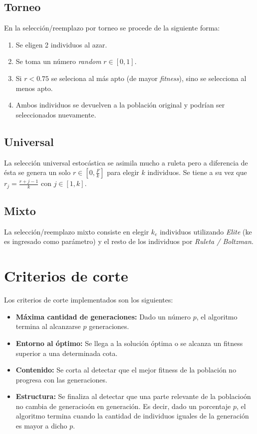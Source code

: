 \documentclass[%
    final,
    reprint,
    notitlepage,
    narroweqnarray,
    inline,
    twoside,
    invited
    ]{ieee}
\begin{document}
\subsection{Torneo}

En la selección/reemplazo por torneo se procede de la siguiente forma:

\begin{enumerate}
\item Se eligen 2 individuos al azar. 
\item Se toma un número \textit{random} $r \in [0, 1]$.
\item Si $r < 0.75$ se seleciona al más apto (de mayor \textit{fitness}), sino se selecciona al menos apto.
\item Ambos individuos se devuelven a la población original y podrían ser seleccionados nuevamente.
\end{enumerate}

\subsection{Universal}

\par La selección universal estocástica se asimila mucho a ruleta pero a diferencia de ésta se genera un solo $r \in [0, \frac{F}{k}]$ para elegir $k$ individuos.  Se tiene a su vez que $r_j = \frac{r + j-1}{k}$ con $j \in [1,k]$.

\subsection{Mixto}

La selección/reemplazo mixto consiste en elegir $k_e$ individuos utilizando \textit{Elite} (ke es ingresado como parámetro) y el resto de los individuos por \textit{Ruleta / Boltzman}.

\section{Criterios de corte}

\par Los criterios de corte implementados son los siguientes:\\

\begin{itemize}
\item \textbf{Máxima cantidad de generaciones:} Dado un número $p$, el algoritmo termina al alcanzarse $p$ generaciones.
\item \textbf{Entorno al óptimo:} Se llega a la solución óptima o se alcanza un fitness superior a una determinada cota.
\item \textbf{Contenido:} Se corta al detectar que el mejor fitness de la población no progresa con las generaciones.
\item \textbf{Estructura:} Se finaliza al detectar que una parte relevante de la poblacioón no cambia de generacioón en generación. Es decir, dado un porcentaje $p$, el algoritmo termina cuando la cantidad de individuos iguales de la generación es mayor a dicho $p$.
\end{itemize}
\end{document}

